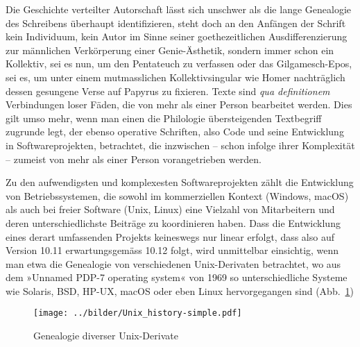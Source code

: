 \documentclass[a4paper,11pt]{article}
\newcommand{\anf}[1]{»#1«}
\begin{document}
\noindent Die Geschichte verteilter Autorschaft lässt sich unschwer als die lange Genealogie des Schreibens überhaupt identifizieren, steht doch an den Anfängen der Schrift kein Individuum, kein Autor im Sinne seiner goethezeitlichen Ausdifferenzierung zur männlichen Verkörperung einer Genie-Ästhetik, sondern immer schon ein Kollektiv, sei es nun, um den Pentateuch zu verfassen oder das Gilgamesch-Epos, sei es, um unter einem mut\-mass\-lichen Kollektivsingular wie Homer nachträglich dessen gesungene Verse auf Papyrus zu fixieren. Texte sind \emph{qua definitionem} Verbindungen loser Fäden, die von mehr als einer Person bearbeitet werden. Dies gilt umso mehr, wenn man einen die Philologie übersteigenden Textbegriff zugrunde legt, der ebenso operative Schriften, also Code und seine Entwicklung in Softwareprojekten, betrachtet, die inzwischen – schon infolge ihrer Komplexität – zumeist von mehr als einer Person vorangetrieben werden. 

Zu den aufwendigsten und komplexesten Softwareprojekten zählt die Entwicklung von Betriebssystemen, die sowohl im kommerziellen Kontext (Windows, macOS) als auch bei freier Software (Unix, Linux) eine Vielzahl von Mitarbeitern und deren unterschiedlichste Beiträge zu koordinieren haben. Dass die Entwicklung eines derart umfassenden Projekts keineswegs nur linear erfolgt, dass also auf Version 10.11 erwartungsgemäss 10.12 folgt, wird unmittelbar einsichtig, wenn man etwa die Genealogie von verschiedenen Unix-Derivaten betrachtet, wo aus dem \anf{Unnamed PDP-7 operating system} von 1969 so unterschiedliche Systeme wie Solaris, BSD, HP-UX, macOS oder eben Linux hervorgegangen sind (Abb.~\ref{abb:unix}) 

\begin{figure}[ht]
\begin{center}
\texttt{[image: ../bilder/Unix\_history-simple.pdf]}\\[-3mm]
\caption{Genealogie diverser Unix-Derivate}\label{abb:unix}
\end{center}
\end{figure}
\end{document}
